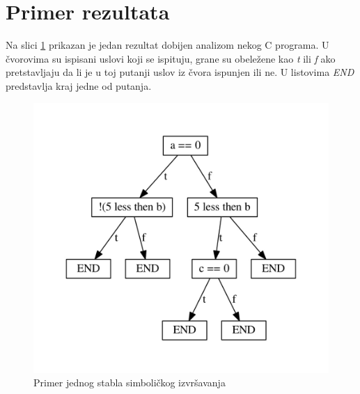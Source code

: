 \documentclass[a4paper]{article}
\begin{document}
\section{Primer rezultata}
Na slici \ref{fig:primer} prikazan je jedan rezultat dobijen analizom nekog C programa. U čvorovima su ispisani uslovi koji se ispituju, grane su obeležene kao \textit{t} ili \textit{f} ako pretstavljaju da li je u toj putanji uslov iz čvora ispunjen ili ne. U listovima \textit{END} predstavlja kraj jedne od putanja.

\begin{figure}[h!]
\begin{center}
\includegraphics[scale=0.3]{primer.jpg}
\end{center}
\caption{Primer jednog stabla simboličkog izvršavanja}
\label{fig:primer}
\end{figure}

\appendix
 

\end{document}
